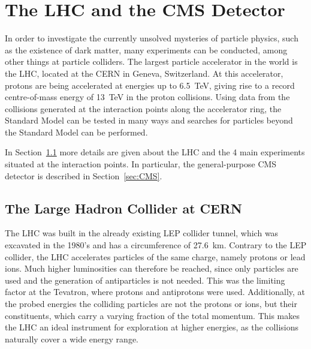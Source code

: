 \graphicspath{{chapt_dutch/}{intro/}{detector/}}

\renewcommand\evenpagerightmark{{\scshape\small Chapter 3}}
\renewcommand\oddpageleftmark{{\scshape\small The LHC and the CMS Detector}}

\hyphenation{}

\chapter{The LHC and the CMS Detector}
\label{ch3}

In order to investigate the currently unsolved mysteries of particle physics, such as the existence of dark matter, many experiments can be conducted, among other things at particle colliders. The largest particle accelerator in the world is the \ac{LHC}, located at the \ac{CERN} in Geneva, Switzerland. At this accelerator, protons are being accelerated at energies up to \SI{6.5}{TeV}, giving rise to a record centre-of-mass energy of \SI{13}{TeV} in the proton collisions. Using data from the collisions generated at the interaction points along the accelerator ring, the Standard Model can be tested in many ways and searches for particles beyond the Standard Model can be performed. 

In Section~\ref{sec:lhc} more details are given about the \ac{LHC} and the 4 main experiments situated at the interaction points. In particular, the general-purpose \ac{CMS} detector is described in Section~\ref{sec:CMS}.

\section{The Large Hadron Collider at CERN} 
\label{sec:lhc}

The \ac{LHC} was built in the already existing \ac{LEP} collider tunnel, which was excavated in the 1980's and has a circumference of 27.6~km. Contrary to the \ac{LEP} collider, the \ac{LHC} accelerates particles of the same charge, namely protons or lead ions. Much higher luminosities can therefore be reached, since only particles are used and the generation of antiparticles is not needed. This was the limiting factor at the Tevatron, where protons and antiprotons were used. Additionally, at the probed energies the colliding particles are not the protons or ions, but their constituents, which carry a varying fraction of the total momentum. %
This makes the \ac{LHC} an ideal instrument for exploration at higher energies, as the collisions naturally cover a wide energy range.

